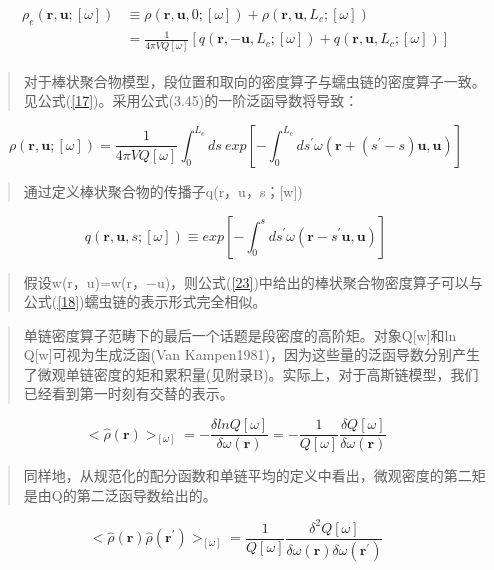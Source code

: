 \begin{align}\label{22}
\begin{split}
\rho_e(\mathbf{r},\mathbf{u};[\omega])&\equiv\rho(\mathbf{r},\mathbf{u},0;[\omega])+\rho(\mathbf{r},\mathbf{u},L_c;[\omega])\\ &=\frac{1}{4\pi VQ[\omega]}[q(\mathbf{r},-\mathbf{u},L_c;[\omega])+q(\mathbf{r},\mathbf{u},L_c;[\omega])]
\end{split}
\end{align}
\begin{quotation}
对于棒状聚合物模型，段位置和取向的密度算子与蠕虫链的密度算子一致。见公式(\ref{17})。采用公式(3.45)的一阶泛函导数将导致：
\end{quotation}
\begin{equation}\label{23}
\rho(\mathbf{r},\mathbf{u};[\omega])=\frac{1}{4\pi VQ[\omega]}\int_{0}^{L_c}ds~exp[-\int_{0}^{L_c}ds^{'}\omega (\mathbf{r}+(s^{'}-s)\mathbf{u},\mathbf{u})]
\end{equation}
\begin{quotation}
通过定义棒状聚合物的传播子q(r，u，s；[w])
\end{quotation}
\begin{equation}\label{24}
q(\mathbf{r},\mathbf{u},s;[\omega])\equiv exp[-\int_{0}^{s}ds^{'}\omega(\mathbf{r}-s^{'}\mathbf{u},\mathbf{u})]
\end{equation}
\begin{quotation}
假设w(r，u)=w(r，−u)，则公式(\ref{23})中给出的棒状聚合物密度算子可以与公式(\ref{18})蠕虫链的表示形式完全相似。
\end{quotation}
\begin{quotation}
单链密度算子范畴下的最后一个话题是段密度的高阶矩。对象Q[w]和ln Q[w]可视为生成泛函(Van Kampen1981)，因为这些量的泛函导数分别产生了微观单链密度的矩和累积量(见附录B)。实际上，对于高斯链模型，我们已经看到第一时刻有交替的表示。
\end{quotation}
\begin{equation}\label{25}
<\hat{\rho}(\mathbf{r})>_{[\omega]}=-\frac{\delta lnQ[\omega]}{\delta \omega(\mathbf{r})}=-\frac{1}{Q[\omega]}\frac{\delta Q[\omega]}{\delta\omega(\mathbf{r})}
\end{equation}
\begin{quotation}
同样地，从规范化的配分函数和单链平均的定义中看出，微观密度的第二矩是由Q的第二泛函导数给出的。
\end{quotation}
\begin{equation}\label{26}
<\hat{\rho}(\mathbf{r})\hat{\rho}(\mathbf{r}^{'})>_{[\omega]}=\frac{1}{Q[\omega]}\frac{\delta^2 Q[\omega]}{\delta\omega(\mathbf{r})\delta \omega(\mathbf{r}^{'})}
\end{equation}
